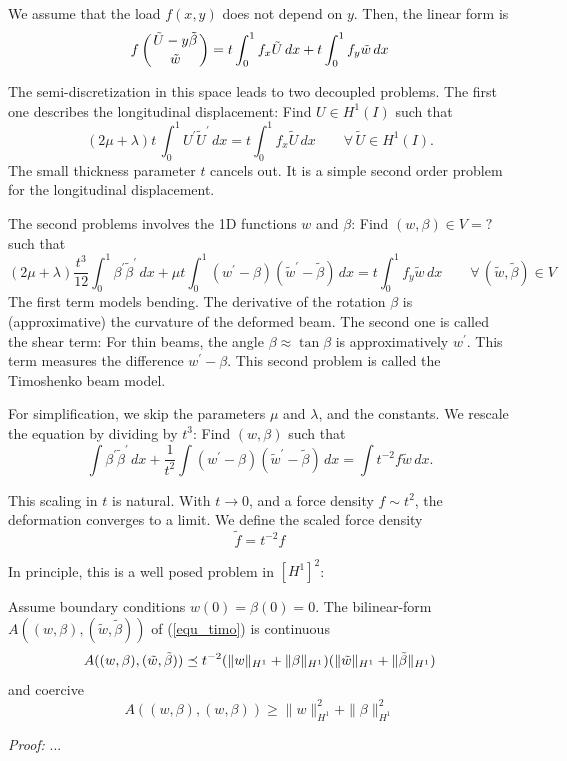 \bigskip

We assume that the load $f(x,y)$ does not depend on $y$. Then, the linear form is
$$
f \left( \tilde U-y \tilde  \beta \atop \tilde w \right) = 
t \int_0^1 f_x \tilde U \, dx + t \int_0^1 f_y \tilde w \, dx
$$

The semi-discretization in this space leads to two decoupled problems. The first one
describes the longitudinal displacement: Find $U \in H^1(I)$ such that
$$
(2 \mu + \lambda) t \, \int_0^1 U^\prime \tilde U^\prime \, dx = 
t \int_0^1 f_x \tilde U \, dx \qquad \forall \, \tilde U \in H^1(I).
$$
The small thickness parameter $t$ cancels out. It is a simple second order problem
for the longitudinal displacement.

\medskip

The second problems involves the 1D functions $w$ and $\beta$: Find $(w,\beta) \in V = ?$
such that
$$
(2\mu+\lambda) \frac{t^3}{12} \int_0^1 \beta^\prime \tilde \beta^\prime \, dx + \mu t \int_0^1 (w^\prime - \beta) (\tilde w^\prime - \tilde \beta) \, dx = t \int_0^1 f_y \tilde w \, dx
\qquad \forall \, (\tilde w, \tilde \beta) \in V
$$
The first term models bending. The derivative of the rotation $\beta$ is (approximative)
the curvature of the deformed beam. The second one is called the shear term: For thin
beams, the angle $\beta \approx \tan \beta$ is approximatively $w^\prime$. This term
measures the difference $w^\prime - \beta$. 
This second problem is called the Timoshenko beam model. 


\bigskip

For simplification, we skip the parameters $\mu$ and $\lambda$, and the constants. 
We rescale the equation by dividing by $t^3$: Find $(w,\beta)$ such that
\begin{equation} \label{equ_timo}
\int \beta^\prime \tilde \beta^\prime \, dx + \frac{1}{t^2} \int (w^\prime - \beta) (\tilde w^\prime - \tilde \beta) \, dx = \int t^{-2} f \tilde w \, dx.
\end{equation}

This scaling in $t$ is natural. With $t \rightarrow 0$, and a force density $f \sim t^2$,
the deformation converges to a limit. We define the scaled force density
$$
\tilde f = t^{-2} f
$$

In principle, this is a well posed problem in $[H^1]^2$:

\begin{lemma} Assume boundary conditions $w(0) = \beta(0) = 0$. The 
bilinear-form $A((w,\beta), (\tilde w, \tilde \beta))$ of (\ref{equ_timo}) is 
continuous
$$
A( (w,\beta), (\tilde w, \tilde \beta)) \preceq t^{-2} 
( \| w \|_{H^1} + \| \beta \|_{H^1} ) ( \| \tilde w \|_{H^1} + \| \tilde \beta \|_{H^1} )
$$
and coercive
$$
A ( (w, \beta), (w, \beta) ) \geq \| w \|_{H^1}^2 + \| \beta \|_{H^1}^2
$$
\end{lemma}
{\em Proof: } ...

